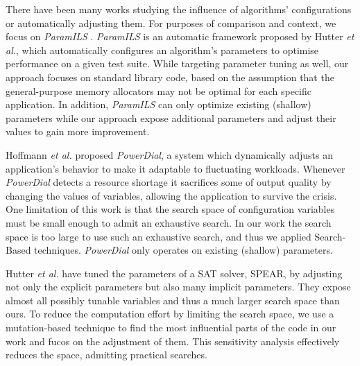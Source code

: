 There have been many works studying the influence of algorithms'
configurations or automatically adjusting them. For purposes of comparison
and context, we focus on \emph{ParamILS} \cite{hutter2009paramils}.
\emph{ParamILS} is an automatic framework proposed by Hutter \emph{et al.},
which automatically configures an algorithm's parameters to optimise
performance on a given test suite. 
While
targeting parameter tuning as well, our approach focuses on standard
library code, based on the assumption that the general-purpose memory
allocators may not be optimal for each specific application. In addition,
\emph{ParamILS} can only optimize existing (shallow) parameters while our
approach expose additional parameters and adjust their values to gain more
improvement.

Hoffmann \emph{et al.} \cite{Hoffmann:2011:DKR:1950365.1950390} proposed
\emph{PowerDial}, a system which dynamically adjusts an application's
behavior to make it adaptable to fluctuating workloads. 
Whenever \emph{PowerDial} detects a resource shortage it sacrifices some of
output quality by changing the values of variables, allowing
the application to survive the crisis. One limitation of
this work is that the search space of configuration variables must be small
enough to admit an exhaustive search. In our work the search space is too
large to use such an exhaustive search, and thus we applied Search-Based
techniques. %
\emph{PowerDial} only operates
on existing (shallow) parameters. 

Hutter \emph{et al.} \cite{4401979} have tuned the parameters of a SAT
solver, SPEAR, by adjusting not only the explicit parameters but also many
implicit parameters. They expose almost all possibly tunable variables 
and
thus a much larger search space than ours. 
To reduce the
computation effort by limiting the search space, we use a mutation-based
technique to find the most influential parts of the code in our work and fucos
on the adjustment of them. 
This sensitivity analysis effectively reduces the 
space, admitting practical searches.

